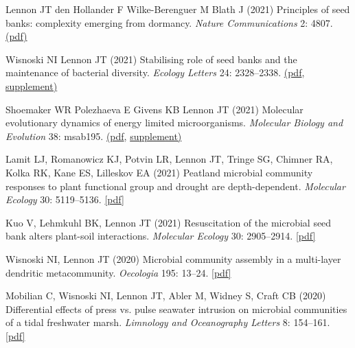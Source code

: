 \documentclass[11pt]{article}
\begin{document}
\begin{etaremune}
\item Lennon JT den Hollander F Wilke-Berenguer M Blath J (2021) Principles of seed banks: complexity emerging from dormancy. \textit{Nature Communications} 2: 4807. \href{https://lennonlab.github.io/assets/publications/Lennon_etal_2021a.pdf}{(pdf)}

\item Wisnoski NI Lennon JT (2021) Stabilising role of seed banks and the maintenance of bacterial diversity. \textit{Ecology Letters} 24: 2328–2338. \href{https://lennonlab.github.io/assets/publications/Wisnoski_Lennon_2021.pdf}{(pdf}, \href{https://lennonlab.github.io/assets/publications/Wisnoski_Lennon_2021_Suppl.pdf}{supplement)}

\item Shoemaker WR Polezhaeva E Givens KB Lennon JT (2021) Molecular evolutionary dynamics of energy limited microorganisms. \textit{Molecular Biology and Evolution} 38: msab195. \href{https://lennonlab.github.io/assets/publications/Shoemaker_etal_2021a.pdf}{(pdf}, \href{https://lennonlab.github.io/assets/publications/Shoemaker_etal_2021a_Suppl.zip}{supplement)}

\item Lamit LJ, Romanowicz KJ, Potvin LR, Lennon JT, Tringe SG, Chimner RA, Kolka RK, Kane ES, Lilleskov EA (2021) Peatland microbial community responses to plant functional group and drought are depth-dependent. \textit{Molecular Ecology} 30: 5119–5136. \href{https://lennonlab.github.io/assets/publications/Lamit_etal_2021.pdf}{[pdf]}

\item Kuo V, Lehmkuhl BK, Lennon JT (2021) Resuscitation of the microbial seed bank alters plant-soil interactions. \textit{Molecular Ecology} 30: 2905–2914. \href{https://lennonlab.github.io/assets/publications/Kuo_etal_2021.pdf}{[pdf]}

\item Wisnoski NI, Lennon JT (2020) Microbial community assembly in a multi-layer dendritic metacommunity. \textit{Oecologia} 195: 13–24. \href{https://lennonlab.github.io/assets/publications/Wisnoski_Lennon_2020.pdf}{[pdf]}

\item Mobilian C, Wisnoski NI, Lennon JT, Abler M, Widney S, Craft CB (2020) Differential effects of press vs. pulse seawater intrusion on microbial communities of a tidal freshwater marsh. \textit{Limnology and Oceanography Letters} 8: 154–161. \href{https://lennonlab.github.io/assets/publications/Mobilian_etal_2020.pdf}{[pdf]}


\end{etaremune}
\end{document}
